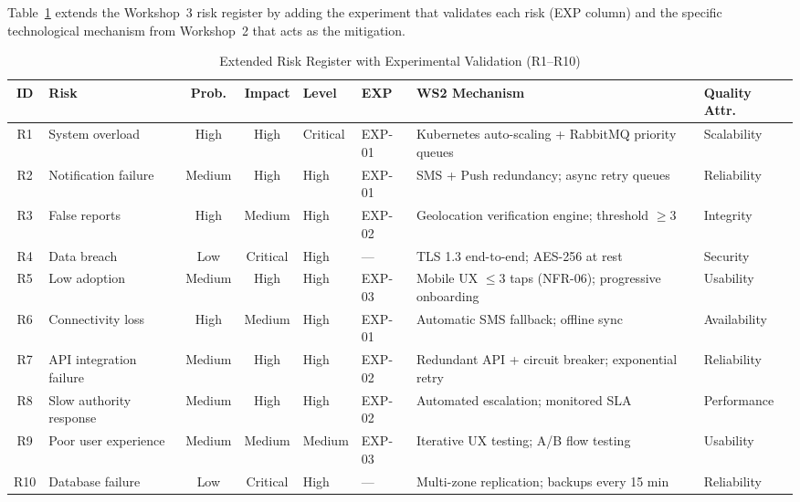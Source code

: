 \documentclass[conference,a4paper,10pt]{IEEEtran}
\begin{document}
Table~\ref{tab:risks} extends the Workshop~3 risk register by
adding the experiment that validates each risk (EXP column) and the
specific technological mechanism from Workshop~2 that acts as the
mitigation.

\begin{table}[t]
\caption{Extended Risk Register with Experimental Validation (R1--R10)}
\label{tab:risks}\centering\small
\begin{tabular}{clcclllp{3.5cm}}
\toprule
\textbf{ID} & \textbf{Risk} & \textbf{Prob.} & \textbf{Impact} &
\textbf{Level} & \textbf{EXP} & \textbf{WS2 Mechanism} & \textbf{Quality Attr.}\\
\midrule
R1  & System overload        & High   & High   & Critical & EXP-01 &
  Kubernetes auto-scaling + RabbitMQ priority queues & Scalability\\
R2  & Notification failure   & Medium & High   & High     & EXP-01 &
  SMS + Push redundancy; async retry queues & Reliability\\
R3  & False reports          & High   & Medium & High     & EXP-02 &
  Geolocation verification engine; threshold $\geq 3$ & Integrity\\
R4  & Data breach            & Low    & Critical & High   & ---    &
  TLS 1.3 end-to-end; AES-256 at rest & Security\\
R5  & Low adoption           & Medium & High   & High     & EXP-03 &
  Mobile UX $\leq 3$ taps (NFR-06); progressive onboarding & Usability\\
R6  & Connectivity loss      & High   & Medium & High     & EXP-01 &
  Automatic SMS fallback; offline sync & Availability\\
R7  & API integration failure & Medium & High  & High     & EXP-02 &
  Redundant API + circuit breaker; exponential retry & Reliability\\
R8  & Slow authority response & Medium & High  & High     & EXP-02 &
  Automated escalation; monitored SLA & Performance\\
R9  & Poor user experience   & Medium & Medium & Medium  & EXP-03 &
  Iterative UX testing; A/B flow testing & Usability\\
R10 & Database failure       & Low    & Critical & High  & ---    &
  Multi-zone replication; backups every 15 min & Reliability\\
\bottomrule
\end{tabular}
\end{table}

\end{document}
